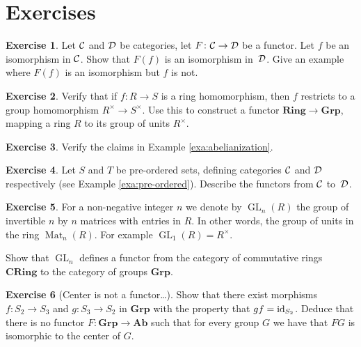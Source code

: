 \documentclass[11pt]{amsbook}
\DeclareMathOperator\GL{GL}
\DeclareMathOperator\Mat{Mat}
\def\id{{\rm id}}
\def\Ab{\mathbf{Ab}}
\def\Grp{\mathbf{Grp}}
\def\Ring{\mathbf{Ring}}
\def\CRing{\mathbf{CRing}}
\theoremstyle{plain}
\theoremstyle{definition}
\newtheorem{exercise}{Exercise}
\begin{document}
\newpage
\section*{Exercises}



\begin{exercise}
Let ${\mathcal{C}}$ and ${\mathcal{D}}$ be categories, let $F\colon {\mathcal{C}} \to {\mathcal{D}}$ be a functor. Let $f$ be an isomorphism in ${\mathcal{C}}$. Show that $F(f)$ is an isomorphism
in~${\mathcal{D}}$.  Give an example where $F(f)$ is an isomorphism but $f$ is not.
\end{exercise}

\begin{exercise}
Verify that if $f\colon R\to S$ is a ring homomorphism, then $f$ restricts to a group homomorphism $R^\times \to S^\times$. Use this to construct a functor $\Ring \to \Grp$, mapping a ring $R$ to its group of units $R^\times$.
\end{exercise}


\begin{exercise}Verify the claims in Example \ref{exa:abelianization}.
\end{exercise}

\begin{exercise}
Let $S$ and $T$ be pre-ordered sets, defining categories ${\mathcal{C}}$ and ${\mathcal{D}}$ respectively (see Example \ref{exa:pre-ordered}). Describe the functors from ${\mathcal{C}}$ to~${\mathcal{D}}$.
\end{exercise}

\begin{exercise}\label{exc:functor-GLn}
For a non-negative integer $n$ we denote by $\GL_n(R)$ the group of invertible $n$ by $n$ matrices with entries in $R$. In other words, the group of units in the ring $\Mat_n(R)$. For example $\GL_1(R) = R^\times$.

Show that $\GL_n$ defines a functor from the category of commutative rings $\CRing$ to the category of groups $\Grp$. 
\end{exercise}


\begin{exercise}[Center is not a functor\ldots]
Show that there exist morphisms $f\colon S_2 \to S_3$ and $g\colon S_3 \to S_2$ in $\Grp$ with the property that $gf=\id_{S_2}$.
Deduce that there is no functor $F\colon \Grp \to \Ab$ such that for every group $G$ we have that $FG$ is isomorphic to the center of $G$.
\end{exercise}
\end{document}
